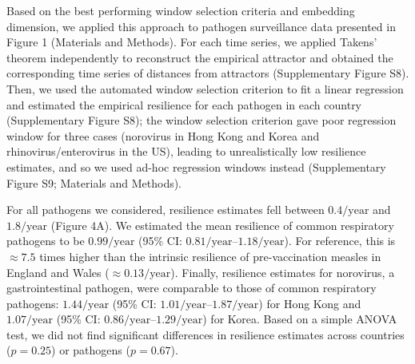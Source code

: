 \documentclass[12pt]{article}
\begin{document}
Based on the best performing window selection criteria and embedding dimension, we applied this approach to pathogen surveillance data presented in Figure 1 (Materials and Methods).
For each time series, we applied Takens' theorem independently to reconstruct the empirical attractor and obtained the corresponding time series of distances from attractors (Supplementary Figure S8).
Then, we used the automated window selection criterion to fit a linear regression and estimated the empirical resilience for each pathogen in each country (Supplementary Figure S8);
the window selection criterion gave poor regression window for three cases (norovirus in Hong Kong and Korea and rhinovirus/enterovirus in the US), leading to unrealistically low resilience estimates, and so we used ad-hoc regression windows instead (Supplementary Figure S9; Materials and Methods).

For all pathogens we considered, resilience estimates fell between $0.4/\mathrm{year}$ and $1.8/\mathrm{year}$ (Figure 4A).
We estimated the mean resilience of common respiratory pathogens to be $0.99/\mathrm{year}$ (95\% CI: $0.81/\mathrm{year}$--$1.18/\mathrm{year}$).
For reference, this is $\approx 7.5$ times higher than the intrinsic resilience of pre-vaccination measles in England and Wales ($\approx 0.13/\mathrm{year}$).
Finally, resilience estimates for norovirus, a gastrointestinal pathogen, were comparable to those of common respiratory pathogens: $1.44/\mathrm{year}$ (95\% CI: $1.01/\mathrm{year}$--$1.87/\mathrm{year}$) for Hong Kong and $1.07/\mathrm{year}$ (95\% CI: $0.86/\mathrm{year}$--$1.29/\mathrm{year}$) for Korea.
Based on a simple ANOVA test, we did not find significant differences in resilience estimates across countries ($p=0.25$) or pathogens ($p=0.67$).
\end{document}
